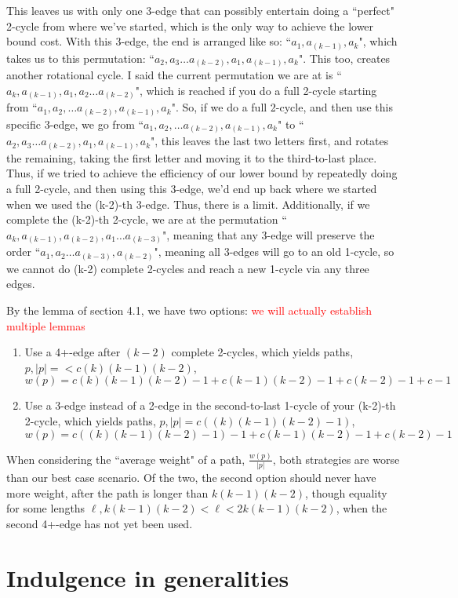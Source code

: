 \documentclass{article}
\theoremstyle{definition}
\newcommand{\edit}[1]{\textcolor{red}{#1}}
\begin{document}
{This leaves us with only one 3-edge that can possibly entertain doing a ``perfect" 2-cycle from where we've started, which is the only way to achieve the lower bound cost. With this 3-edge, the end is arranged like so: ``$a_1,a_{(k-1)},a_k$", which takes us to this permutation: ``$a_2,a_3\dots a_{(k-2)},a_1,a_{(k-1)},a_k$". This too, creates another rotational cycle. I said the current permutation we are at is ``$a_k,a_{(k-1)},a_1, a_2 \dots  a_{(k-2)}$", which is reached if you do a full 2-cycle starting from ``$a_1,a_2,\dots  a_{(k-2)},a_{(k-1)},a_k$". So, if we do a full 2-cycle, and then use this specific 3-edge, we go from ``$a_1,a_2,\dots  a_{(k-2)},a_{(k-1)},a_k$" to ``$a_2,a_3\dots a_{(k-2)},a_1,a_{(k-1)},a_k$", this leaves the last two letters first, and rotates the remaining, taking the first letter and moving it to the third-to-last place. Thus, if we tried to achieve the efficiency of our lower bound by repeatedly doing a full 2-cycle, and then using this 3-edge, we'd end up back where we started when we used the (k-2)-th 3-edge. Thus, there is a limit. Additionally, if we complete the (k-2)-th 2-cycle, we are at the permutation ``$a_k,a_{(k-1)},a_{(k-2)},a_1\dots  a_{(k-3)}$", meaning that any 3-edge will preserve the order ``$a_1,a_2\dots  a_{(k-3)},a_{(k-2)}$", meaning all 3-edges will go to an old 1-cycle, so we cannot do (k-2) complete 2-cycles and reach a new 1-cycle via any three edges.

By the lemma of section 4.1, we have two options:\edit{ we will actually establish multiple lemmas}

\begin{enumerate}
    \item Use a 4+-edge after $(k-2)$ complete 2-cycles, which yields paths, $p, |p| =< c(k)(k-1)(k-2)$, $w(p) = c(k)(k-1)(k-2)-1 + c(k-1)(k-2)-1 + c(k-2)-1 + c-1$
    \item Use a 3-edge instead of a 2-edge in the second-to-last 1-cycle of your (k-2)-th 2-cycle, which yields paths, $p, |p| = c((k)(k-1)(k-2)-1)$, $w(p) = c((k)(k-1)(k-2)-1)-1 + c(k-1)(k-2)-1 + c(k-2)-1$
\end{enumerate}
When considering the ``average weight" of a path, $\frac{w(p)}{|p|}$, both strategies are worse than our best case scenario. Of the two, the second option should never have more weight, after the path is longer than $k(k-1)(k-2)$, though equality for some lengths $\ell, k(k-1)(k-2) < \ell < 2k(k-1)(k-2)$, when the second 4+-edge has not yet been used.


\section{Indulgence in generalities} \label{formality}

}
\end{document}
